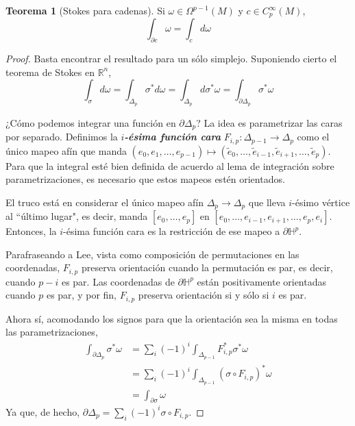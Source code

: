 \documentclass[spanish]{article}
\theoremstyle{definition}
\newtheorem*{teo}{Teorema}
\newcommand{\R}{\mathbb{R}}
\begin{document}
	\begin{teo}[Stokes para cadenas]
		Si $\omega\in\Omega^{p-1}(M)$ y $c\in C^\infty_p(M)$,
		\[\int_{\partial c}\omega=\int_cd\omega\]
	\end{teo}
	\begin{proof}
		Basta encontrar el resultado para un sólo simplejo. Suponiendo cierto el teorema de Stokes en $\R^n$,
		\[\int_{\sigma}d\omega=\int_{\Delta_p}\sigma^*d\omega=\int_{\Delta_p}d\sigma^*\omega=\int_{\partial \Delta_p}\sigma^*\omega\]
		
		¿Cómo podemos integrar una función en $\partial\Delta_p$? La idea es parametrizar las caras por separado. Definimos la \textbf{\textit{$i$-ésima función cara}} $F_{i,p}:\Delta_{p-1}\to\Delta_p$ como el único mapeo afín que manda $(e_0,e_1,\ldots,e_{p-1})\mapsto (\tilde{e}_0,\ldots,\tilde{e}_{i-1},\tilde{e}_{i+1},\ldots,\tilde{e}_p)$. Para que la integral esté bien definida de acuerdo al lema de integración sobre parametrizaciones, es necesario que estos mapeos estén orientados.
		
		El truco está en considerar el único mapeo afín $\Delta_p\to\Delta_p$ que lleva $i$-ésimo vértice al ``último lugar", es decir, manda $[e_0,\ldots,e_p]$ en $[e_0,\ldots,e_{i-1},e_{i+1},\ldots,e_p,e_i]$. Entonces, la $i$-ésima función cara es la restricción de ese mapeo a $\partial\mathbb{H}^p$.
		
		Parafraseando a Lee, vista como composición de permutaciones en las coordenadas, $F_{i,p}$ preserva orientación cuando la permutación es par, es decir, cuando $p-i$ es par. Las coordenadas de $\partial\mathbb{H}^p$ están positivamente orientadas cuando $p$ es par, y por fin, $F_{i,p}$ preserva orientación si y sólo si $i$ es par.
		
		Ahora sí, acomodando los signos para que la orientación sea la misma en todas las parametrizaciones,
		\begin{align*}
			\int_{\partial\Delta_p}\sigma^*\omega&=\sum_i(-1)^i\int_{\Delta_{p-1}}F^*_{i,p}\sigma^*\omega\\
			&=\sum_i(-1)^i\int_{\Delta_{p-1}}(\sigma\circ F_{i,p})^*\omega\\
			&=\int_{\partial\sigma}\omega
		\end{align*}
		Ya que, de hecho, $\partial\Delta_p=\sum_i(-1)^i\sigma\circ F_{i,p}$.
	\end{proof}
	
\end{document}
